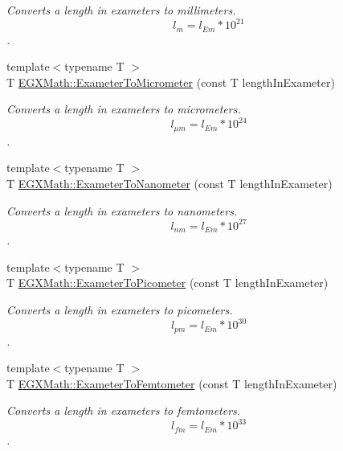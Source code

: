 \begin{DoxyCompactItemize}
\begin{DoxyCompactList}\small\item\em Converts a length in exameters to millimeters. \[ l_{m}=l_{Em} * 10^{21} \]. \end{DoxyCompactList}\item 
{\footnotesize template$<$typename T $>$ }\\T \mbox{\hyperlink{group___e_g_x_math-_conversions-_length_conversions-_exameter-_s_i_gaee4a8b1fa77d023e7db7180e62646388}{E\+G\+X\+Math\+::\+Exameter\+To\+Micrometer}} (const T length\+In\+Exameter)
\begin{DoxyCompactList}\small\item\em Converts a length in exameters to micrometers. \[ l_{\mu m}=l_{Em} * 10^{24} \]. \end{DoxyCompactList}\item 
{\footnotesize template$<$typename T $>$ }\\T \mbox{\hyperlink{group___e_g_x_math-_conversions-_length_conversions-_exameter-_s_i_ga78c5c3f8008fc44c81b3d89b44d3db19}{E\+G\+X\+Math\+::\+Exameter\+To\+Nanometer}} (const T length\+In\+Exameter)
\begin{DoxyCompactList}\small\item\em Converts a length in exameters to nanometers. \[ l_{nm}=l_{Em} * 10^{27} \]. \end{DoxyCompactList}\item 
{\footnotesize template$<$typename T $>$ }\\T \mbox{\hyperlink{group___e_g_x_math-_conversions-_length_conversions-_exameter-_s_i_gaf524e8324fedf2eb61d43ce1dc36bcac}{E\+G\+X\+Math\+::\+Exameter\+To\+Picometer}} (const T length\+In\+Exameter)
\begin{DoxyCompactList}\small\item\em Converts a length in exameters to picometers. \[ l_{pm}=l_{Em} * 10^{30} \]. \end{DoxyCompactList}\item 
{\footnotesize template$<$typename T $>$ }\\T \mbox{\hyperlink{group___e_g_x_math-_conversions-_length_conversions-_exameter-_s_i_gaaa4f07b6d6b2e4a9e1947d4d9724c110}{E\+G\+X\+Math\+::\+Exameter\+To\+Femtometer}} (const T length\+In\+Exameter)
\begin{DoxyCompactList}\small\item\em Converts a length in exameters to femtometers. \[ l_{fm}=l_{Em} * 10^{33} \]. \end{DoxyCompactList}\item 

\end{DoxyCompactItemize}
